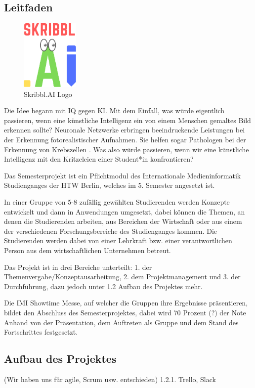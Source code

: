 \documentclass[11pt]{article}
\begin{document}
\subsection{Leitfaden}
\begin{figure}
\centering
\includegraphics[width=0.25\textwidth]{images/skribbl_logo.png}
\caption{\label{fig:skribblLogo}Skribbl.AI Logo}
\end{figure}
Die Idee begann mit IQ gegen KI. Mit dem Einfall, was würde eigentlich passieren, wenn eine künstliche Intelligenz ein von einem Menschen gemaltes Bild  erkennen sollte? Neuronale Netzwerke erbringen beeindruckende Leistungen bei der Erkennung fotorealistischer Aufnahmen. Sie helfen sogar Pathologen bei der Erkennung von Krebszellen \parencite{ElizabethDougherty2018}. Was also würde  passieren, wenn wir eine künstliche Intelligenz mit den Kritzeleien einer Student*in konfrontieren?

Das Semesterprojekt ist ein Pflichtmodul des Internationale Medieninformatik Studienganges der HTW Berlin, welches im 5. Semester angesetzt ist.

In einer Gruppe von 5-8 zufällig gewählten Studierenden werden Konzepte entwickelt und dann in Anwendungen umgesetzt, dabei können die Themen, an denen die Studierenden arbeiten, aus Bereichen der Wirtschaft oder aus einem der verschiedenen Forschungsbereiche des Studienganges kommen.
Die Studierenden werden dabei von einer Lehrkraft bzw. einer verantwortlichen Person aus dem wirtschaftlichen Unternehmen betreut.

Das Projekt ist in drei Bereiche unterteilt: 1. der Themenvergabe/Konzeptausarbeitung, 2. dem Projektmanagement und 3. der Durchführung, dazu jedoch unter 1.2 Aufbau des Projektes mehr.

Die IMI Showtime Messe, auf welcher die Gruppen ihre Ergebnisse präsentieren, bildet den Abschluss des Semesterprojektes, dabei wird 70 Prozent (?) der Note Anhand von der Präsentation, dem Auftreten als Gruppe und dem Stand des Fortschrittes festgesetzt.
\subsection{Aufbau des Projektes}
    (Wir haben uns für agile, Scrum usw. entschieden)    1.2.1. Trello, Slack
\end{document}
